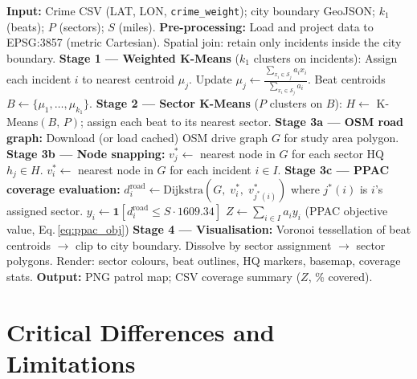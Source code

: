 \documentclass[12pt]{article}
\begin{document}
\begin{algorithm}[H]
\caption{Road-Network PPAC Extension --- Full Pipeline}
\begin{algorithmic}[1]
\State \textbf{Input:} Crime CSV (LAT, LON, \texttt{crime\_weight}); city boundary GeoJSON;
       $k_1$ (beats); $P$ (sectors); $S$ (miles).
\State \textbf{Pre-processing:}
    \Statex \quad Load and project data to EPSG:3857 (metric Cartesian).
    \Statex \quad Spatial join: retain only incidents inside the city boundary.
\State \textbf{Stage 1 --- Weighted K-Means} ($k_1$ clusters on incidents):
    \Repeat
        \State Assign each incident $i$ to nearest centroid $\mu_j$.
        \State Update $\mu_j \leftarrow \frac{\sum_{x_i \in \mathcal{S}_j} a_i x_i}
                                              {\sum_{x_i \in \mathcal{S}_j} a_i}$.
    \State Beat centroids $B \leftarrow \{\mu_1, \dots, \mu_{k_1}\}$.
\State \textbf{Stage 2 --- Sector K-Means} ($P$ clusters on $B$):
    \State $H \leftarrow $ K-Means$(B,\, P)$; assign each beat to its nearest sector.
\State \textbf{Stage 3a --- OSM road graph:}
    \Statex \quad Download (or load cached) OSM drive graph $G$ for study area polygon.
\State \textbf{Stage 3b --- Node snapping:}
    \Statex \quad $v^*_j \leftarrow $ nearest node in $G$ for each sector HQ $h_j \in H$.
    \Statex \quad $v^*_i \leftarrow $ nearest node in $G$ for each incident $i \in I$.
\State \textbf{Stage 3c --- PPAC coverage evaluation:}
        \State $d^{\mathrm{road}}_i \leftarrow
               \text{Dijkstra}(G,\; v^*_i,\; v^*_{j^*(i)})$
               \quad where $j^*(i)$ is $i$'s assigned sector.
        \State $y_i \leftarrow \mathbf{1}[d^{\mathrm{road}}_i \le S \cdot 1609.34]$
    \EndFor
    \State $Z \leftarrow \sum_{i \in I} a_i y_i$ \quad (PPAC objective value, Eq.\,\ref{eq:ppac_obj})
\State \textbf{Stage 4 --- Visualisation:}
    \Statex \quad Voronoi tessellation of beat centroids $\to$ clip to city boundary.
    \Statex \quad Dissolve by sector assignment $\to$ sector polygons.
    \Statex \quad Render: sector colours, beat outlines, HQ markers, basemap, coverage stats.
\State \textbf{Output:} PNG patrol map; CSV coverage summary ($Z$, \% covered).
\end{algorithmic}
\end{algorithm}

\section{Critical Differences and Limitations}
\end{document}
